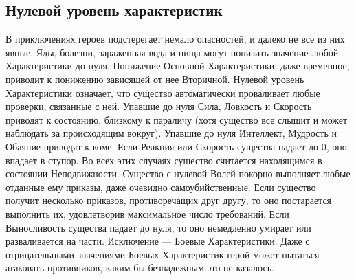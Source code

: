\subsection{Нулевой уровень характеристик}
В приключениях героев подстерегает немало опасностей, и далеко не все из них явные. Яды, болезни, зараженная вода и пища могут понизить значение любой Характеристики до нуля. Понижение Основной Характеристики, даже временное, приводит к понижению зависящей от нее Вторичной.
\newline Нулевой уровень Характеристики означает, что существо автоматически проваливает любые проверки, связанные с ней. Упавшие до нуля Сила, Ловкость и Скорость приводят к состоянию, близкому к параличу (хотя существо все слышит и может наблюдать за происходящим вокруг). Упавшие до нуля Интеллект, Мудрость и Обаяние приводят к коме. Если Реакция или Скорость существа падает до 0, оно впадает в ступор. Во всех этих случаях существо считается находящимся в состоянии Неподвижности. Существо с нулевой Волей покорно выполняет любые отданные ему приказы, даже очевидно самоубийственные. Если существо получит несколько приказов, противоречащих друг другу, то оно постарается выполнить их, удовлетворив максимальное число требований. Если Выносливость существа падает до нуля, то оно немедленно умирает или разваливается на части.
\newline Исключение — Боевые Характеристики. Даже с отрицательными значениями Боевых Характеристик герой может пытаться атаковать противников, каким бы безнадежным это не казалось.
